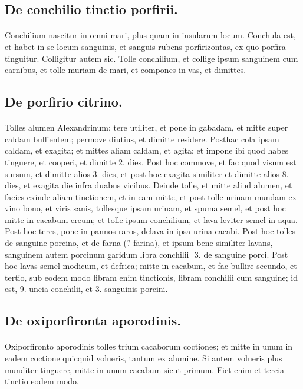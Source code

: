 \documentclass[a4paper, 11pt, oneside, polutonikogreek, italian]{article}
\newcommand*\svgaaa{}
\begin{document}
\subsection{De conchilio tinctio porfirii.}
\paragraph{}
Conchilium nascitur in omni mari, plus quam in insularum locum. Conchula est, et habet in se locum sanguinis, et sanguis rubens porfirizontas, ex quo porfira tinguitur. Colligitur autem sic. Tolle conchilium, et collige ipsum sanguinem cum carnibus, et tolle muriam de mari, et compones in vas, et dimittes.

\subsection{De porfirio citrino.}
\paragraph{}
Tolles alumen Alexandrinum; tere utiliter, et pone in gabadam, et mitte super caldam bullientem; permove diutius, et dimitte residere. Posthac cola ipsam caldam, et exagita; et mittes aliam caldam, et agita; et impone ibi quod habes tinguere, et cooperi, et dimitte 2. dies. Post hoc commove, et fac quod visum est sursum, et dimitte alios 3. dies, et post hoc exagita similiter et dimitte alios 8. dies, et exagita die infra duabus vicibus. Deinde tolle, et mitte aliud alumen, et facies exinde aliam tinctionem, et in eam mitte, et post tolle urinam mundam ex vino bono, et viris sanis, tollesque ipsam urinam, et spuma semel, et post hoc mitte in cacabum ereum; et tolle ipsum conchilium, et lava leviter semel in aqua. Post hoc teres, pone in pannos raros, delava in ipsa urina cacabi. Post hoc tolles de sanguine porcino, et de farna (? farina), et ipsum bene similiter lavans, sanguinem autem porcinum garidum libra conchilii $\svgaaa$ 3. de sanguine porci. Post hoc lavas semel modicum, et defrica; mitte in cacabum, et fac bullire secundo, et tertio, sub eodem modo libram enim tinctionis, libram conchilii cum sanguine; id est, 9. uncia conchilii, et 3. sanguinis porcini.

\subsection{De oxiporfironta aporodinis.}
\paragraph{}
Oxiporfironto aporodinis tolles trium cacaborum coctiones; et mitte in unum in eadem coctione quicquid volueris, tantum ex alumine. Si autem volueris plus munditer tinguere, mitte in unum cacabum sicut primum. Fiet enim et tercia tinctio eodem modo.
\end{document}
